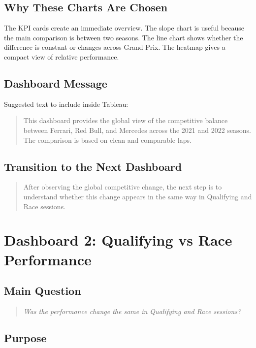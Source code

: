 \documentclass[12pt,a4paper]{article}
\begin{document}
	\subsection{Why These Charts Are Chosen}
	
	The KPI cards create an immediate overview.
	The slope chart is useful because the main comparison is between two seasons.
	The line chart shows whether the difference is constant or changes across Grand Prix.
	The heatmap gives a compact view of relative performance.
	
	\subsection{Dashboard Message}
	
	Suggested text to include inside Tableau:
	
	\begin{quote}
		This dashboard provides the global view of the competitive balance between Ferrari, Red Bull, and Mercedes across the 2021 and 2022 seasons. The comparison is based on clean and comparable laps.
	\end{quote}
	
	\subsection{Transition to the Next Dashboard}
	
	\begin{quote}
		After observing the global competitive change, the next step is to understand whether this change appears in the same way in Qualifying and Race sessions.
	\end{quote}
	
	\section{Dashboard 2: Qualifying vs Race Performance}
	
	\subsection{Main Question}
	
	\begin{quote}
		\textit{Was the performance change the same in Qualifying and Race sessions?}
	\end{quote}
	
	\subsection{Purpose}
	
\end{document}

